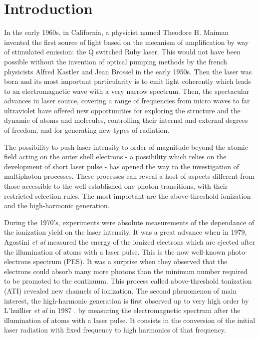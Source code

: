\documentclass[a4paper]{article}
\begin{document}
\newpage
\unboldmath{\tableofcontents}
\newpage


\section{Introduction}

In the early 1960s, in California, a physicist named Theodore H. Maiman invented the first source of light based on the mecanism of amplification by way of stimulated emission: the Q switched Ruby laser. This would not have been possible without the invention of optical pumping methods by the french physicists Alfred Kastler and Jean Brossel in the early 1950s. Then the laser was born and its most important particularity is to emit light coherently which leads to an electromagnetic wave with a very narrow spectrum.
Then, the spectacular advances in laser source, covering a range of frequencies from micro waves to far ultraviolet have offered new opportunities for exploring the structure and the dynamic of atoms and molecules, controlling their internal and external degrees of freedom, and for generating new types of radiation. 
\par
The possibility to push laser intensity to order of magnitude beyond the atomic field acting on the outer shell electrons - a possibility which relies on the development of short laser pulse - has opened the way to the investigation of multiphoton processes. These processes can reveal a host of aspects different from those accessible to the well established one-photon transitions, with their restricted selection rules.
The most important are the above-threshold ionization and the high-harmonic generation.
\par
During the 1970's, experiments were absolute measurements of the dependance of the ionization yield on the laser intensity.
It was a great advance when in 1979, Agostini \textit{et al} \cite{Agostini_1979} measured the energy of the ionized electrons which are ejected after the illumination of atoms with a laser pulse. This is the now well-known photo-electrons spectrum (PES). It was a surprise when they observed that the electrons could absorb many more photons than the minimum number required to be promoted to the continuum. This process called above-threshold tonization (ATI) revealed new channels of ionization.
The second phenomenon of main interest, the high-harmonic generation is first observed up to very high order by L'huillier \textit{et al} in 1987 \cite{Ferray_1988}. by measuring the electromagnetic spectrum after the illumination of atoms with a laser pulse. It consists in the conversion of the initial laser radiation with fixed frequency to high harmonics of that frequency.
\end{document}
